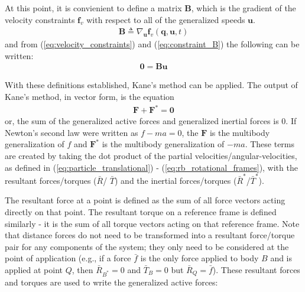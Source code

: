 \documentclass[smallcondensed,final]{svjour3}                     %
\begin{document}
At this point, it is convienient to define a matrix $\mathbf{B}$, which is the
gradient of the velocity constraints $\mathbf{f}_v$ with respect to all of the
generalized speeds $\mathbf{u}$.
\begin{align}
\label{eq:constraint_B}
\mathbf{B} \triangleq \nabla_{\mathbf{u}} \mathbf{f}_v (\mathbf{q}, \mathbf{u},
t)
\end{align}
and from (\ref{eq:velocity_constraints}) and (\ref{eq:constraint_B}) the
following can be written:
\begin{align}
\label{eq:constraint_Bu0}
\mathbf{0} = \mathbf{B}\mathbf{u}
\end{align}

With these definitions established, Kane's method can be applied.
The output of Kane's method, in vector form, is the equation
\begin{align}
\label{eq:kanes_eq}
\mathbf{F} + \mathbf{F}^* = \mathbf{0}
\end{align}
or, the sum of the generalized active forces and generalized inertial forces is
0.
If Newton's second law were written as $f - ma = 0$, the $\mathbf{F}$ is the
multibody generalization of $f$ and $\mathbf{F}^*$ is the multibody
generalization of $-ma$.
These terms are created by taking the dot product of the partial
velocities/angular-velocities, as defined in (\ref{eq:particle_translational})
- (\ref{eq:rb_rotational_frames}), with the resultant forces/torques ($\bar{R}$/
$\bar{T}$) and the inertial forces/torques ($\bar{R}^*$/$\bar{T}^*$).

The resultant force at a point is defined as the sum of all force vectors
acting directly on that point.
The resultant torque on a reference frame is defined similarly - it is the sum
of all torque vectors acting on that reference frame.
Note that distance forces do not need to be transformed into a resultant
force/torque pair for any components of the system; they only need to be
considered at the point of application (e.g., if a force $\bar{f}$ is the only
force applied to body $B$ and is applied at point $Q$, then $\bar{R}_{B^*}=0$
and $\bar{T}_B=0$ but $\bar{R}_Q=\bar{f}$).
These resultant forces and torques are used to write the generalized active
forces:
\end{document}
